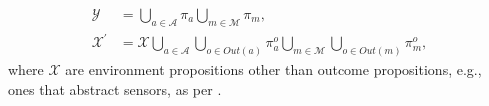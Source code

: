\begin{subequations}
	\label{ActOutAP}
	\begin{align}
		\mathcal{Y} &= \bigcup \limits_{a \in \mathcal{A}} \pi_a \bigcup \limits_{m \in \mathcal{M}} \pi_m,\\
		\mathcal{X}^\prime &= \mathcal{X} \bigcup \limits_{a \in \mathcal{A}} \bigcup \limits_{o \in Out(a)} \pi_a^o \bigcup \limits_{m \in \mathcal{M}} \bigcup \limits_{o \in Out(m)} \pi_m^o,
	\end{align}
\end{subequations}
where $\mathcal{X}$ are environment propositions other than outcome propositions, e.g., ones that abstract sensors, as per \cite{KGFP_TRO09}.

